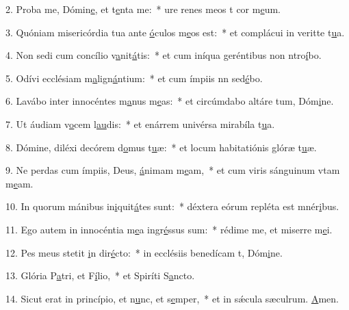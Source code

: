 2. Proba me, Dómin\uline{e}, et t\uline{e}nta me:~* ure renes meos t cor m\uline{e}um.\par 
3. Quóniam misericórdia tua ante \uline{ó}culos m\uline{e}os est:~* et complácui in veritte t\uline{u}a.\par 
4. Non sedi cum concílio v\uline{a}nit\uline{á}tis:~* et cum iníqua geréntibus non ntro\uline{í}bo.\par 
5. Odívi ecclésiam m\uline{a}lign\uline{á}ntium:~* et cum ímpiis nn sed\uline{é}bo.\par 
6. Lavábo inter innocéntes m\uline{a}nus m\uline{e}as:~* et circúmdabo altáre tum, Dóm\uline{i}ne.\par 
7. Ut áudiam v\uline{o}cem l\uline{au}dis:~* et enárrem univérsa mirabíla t\uline{u}a.\par 
8. Dómine, diléxi decórem d\uline{o}mus t\uline{u}æ:~* et locum habitatiónis glóræ t\uline{u}æ.\par 
9. Ne perdas cum ímpiis, Deus, \uline{á}nimam m\uline{e}am,~* et cum viris sánguinum vtam m\uline{e}am.\par 
10. In quorum mánibus in\uline{i}quit\uline{á}tes sunt:~* déxtera eórum repléta est mnér\uline{i}bus.\par 
11. Ego autem in innocéntia m\uline{e}a ingr\uline{é}ssus sum:~* rédime me, et miserre m\uline{e}i.\par 
12. Pes meus stetit \uline{i}n dir\uline{é}cto:~* in ecclésiis benedícam t, Dóm\uline{i}ne.\par 
13. Glória P\uline{a}tri, et F\uline{í}lio,~* et Spiríti S\uline{a}ncto.\par 
14. Sicut erat in princípio, et n\uline{u}nc, et s\uline{e}mper,~* et in sǽcula sæculrum. \uline{A}men.\par 
